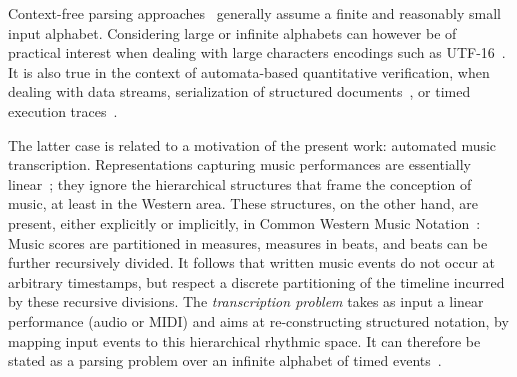 

Context-free parsing approaches~\cite{GruneJacobs08parsing}
generally assume a finite and reasonably small input alphabet. %
Considering large or infinite alphabets can however be of
practical interest when dealing with large characters encodings such as UTF-16~\cite{dAntoni21CACM}.
It is also true in the context of automata-based quantitative verification,  %
\eg when dealing with data streams, 
serialization of structured documents~\cite{Segoufin06csl,NevenSchwentickVianu04FSMinfinite},
or timed execution traces~\cite{Bouyer03algebraic}.


The latter case is related to a motivation  of  the present work: 
automated music transcription. Representations capturing music performances
are essentially linear~\cite{Selfridge-Field97beyondMIDI};
they ignore the hierarchical structures that frame the
conception of music, at least in the Western area. 
These structures, on the other hand, are present, either explicitly  or implicitly,
in Common Western Music Notation~\cite{Gould11Notation}:
Music scores are partitioned in measures,
measures in beats, and beats can be further recursively divided.
It follows that written music events do not occur at arbitrary timestamps,
but respect a discrete partitioning of the timeline incurred by
these recursive divisions.
The \emph{transcription problem} takes
as input a linear performance (audio or MIDI) and aims at re-constructing
structured notation, 
by mapping input events to this hierarchical rhythmic space.
It can therefore be stated as a parsing problem
over an infinite alphabet of timed events~\cite{foscarin:hal-01988990}.

